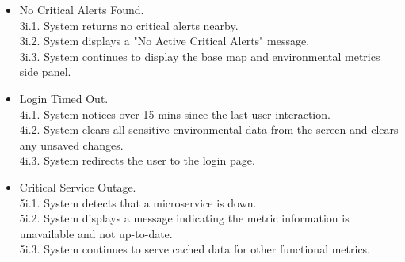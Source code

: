 \documentclass[]{article}
\begin{document}
\begin{enumerate}[{\bf BE1.}]
\begin{itemize}
			\hspace{1cm}2i.3. System sets the default area as the current location and loads the map. \\
			\hspace{1cm}2i.4. External User updates their geographical area by searching on the map.
			\item[3i.] No Critical Alerts Found. \\
			\hspace{1cm}3i.1. System returns no critical alerts nearby. \\
			\hspace{1cm}3i.2. System displays a "No Active Critical Alerts" message. \\
			\hspace{1cm}3i.3. System continues to display the base map and environmental metrics side panel.
			\item[4i.] Login Timed Out. \\
			\hspace{1cm}4i.1. System notices over 15 mins since the last user interaction. \\
			\hspace{1cm}4i.2. System clears all sensitive environmental data from the screen and clears any unsaved changes. \\
			\hspace{1cm}4i.3. System redirects the user to the login page.
			\item[5i.] Critical Service Outage. \\
			\hspace{1cm}5i.1. System detects that a microservice is down. \\
			\hspace{1cm}5i.2. System displays a message indicating the metric information is unavailable and not up-to-date. \\
			\hspace{1cm}5i.3. System continues to serve cached data for other functional metrics.
		\end{itemize}



\end{enumerate}
\end{document}

